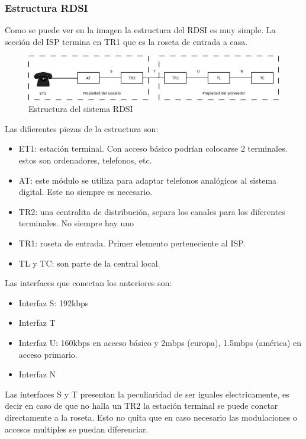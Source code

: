 \subsubsection{Estructura RDSI}
Como se puede ver en la imagen la estructura del RDSI es muy simple. La sección del ISP termina en TR1 que es la roseta de entrada a casa.
\begin{figure}[htp]
	\centering
	\includegraphics[width=\textwidth]{Imagen/diaRDSI.jpg}
	\caption{Estructura del sistema RDSI}
	\label{}
\end{figure}
Las difierentes piezas de la estructura son:
\begin{itemize}
	\item ET1: estación terminal. Con acceso básico podrían colocarse 2 terminales. estos son ordenadores, telefonos, etc.
	\item AT: este módulo se utiliza para adaptar telefonos analógicos al sistema digital. Este no siempre es necesario.
	\item TR2: una centralita de distribución, separa los canales para los diferentes terminales. No siempre hay uno
	\item TR1: roseta de entrada. Primer elemento perteneciente al ISP.
	\item TL y TC: son parte de la central local.
\end{itemize}
Las interfaces que conectan los anteriores son:
\begin{itemize}
	\item Interfaz S: 192kbps
	\item Interfaz T
	\item Interfaz U: 160kbps en acceso básico y 2mbps (europa), 1.5mbps (américa) en acceso primario.
	\item Interfaz N
\end{itemize}
Las interfaces S y T presentan la peculiaridad de ser iguales electricamente, es decir en caso de que no halla un TR2 la estación terminal se puede conctar directamente a la roseta. Esto no quita que en caso necesario las modulaciones o accesos multiples se puedan diferenciar.\\
